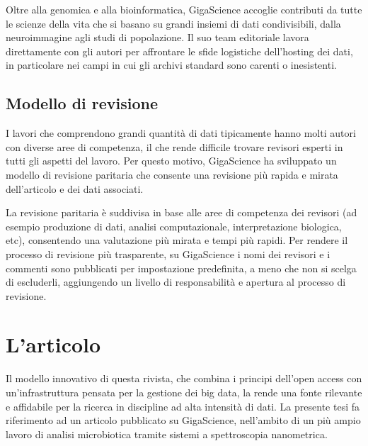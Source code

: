 \documentclass[../main.tex]{subfiles}
\begin{document}
Oltre alla genomica e alla bioinformatica, GigaScience accoglie contributi da tutte le scienze della vita che si basano su grandi insiemi di dati condivisibili, dalla neuroimmagine agli studi di popolazione. Il suo team editoriale lavora direttamente con gli autori per affrontare le sfide logistiche dell'hosting dei dati, in particolare nei campi in cui gli archivi standard sono carenti o inesistenti.

\subsection{Modello di revisione}

I lavori che comprendono grandi quantità di dati tipicamente hanno molti autori con diverse aree di competenza, il che rende difficile trovare revisori esperti in tutti gli aspetti del lavoro.
Per questo motivo, GigaScience ha sviluppato un modello di revisione paritaria  che consente una revisione più rapida e mirata dell'articolo e dei dati associati.

La revisione paritaria è suddivisa in base alle aree di competenza dei revisori (ad esempio produzione di dati, analisi computazionale, interpretazione biologica, etc), consentendo una valutazione più mirata e tempi più rapidi.
Per rendere il processo di revisione più trasparente, su GigaScience i nomi dei revisori e i commenti sono pubblicati per impostazione predefinita, a meno che non si scelga di escluderli, aggiungendo un livello di responsabilità e apertura al processo di revisione.

\section{L'articolo}

Il modello innovativo di questa rivista, che combina i principi dell’open access con un’infrastruttura pensata per la gestione dei big data, la rende una fonte rilevante e affidabile per la ricerca in discipline ad alta intensità di dati.
La presente tesi fa riferimento ad un articolo pubblicato su GigaScience, nell’ambito di un più ampio lavoro di analisi microbiotica tramite sistemi a spettroscopia nanometrica.
\end{document}

